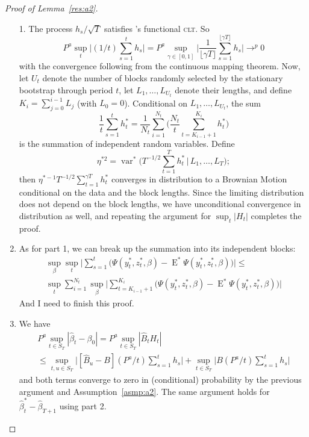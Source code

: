 \documentclass[12pt]{article}
\newcommand\citepos[2][]{\citeauthor{#2}'s \citeyearpar[#1]{#2}}
\theoremstyle{definition}
\DeclareMathOperator{\E}{E}
\DeclareMathOperator{\var}{var}
\newcommand{\clt}{\textsc{clt}}
\begin{document}
\begin{proof}[Proof of Lemma~\ref{res:a2}]
  \begin{enumerate}
  \item[1.] The process $h_{s} / \sqrt{T}$
    satisfies \citepos[Theorem 3.1]{JoD:00b} functional \clt.  So
    \begin{equation}
      P^a \sup_t \Big| (1/t) \sum_{s=1}^t h_{s} \Big| =
      P^a \sup_{\gamma \in [0,1]} \Bigg| \frac{1}{\lfloor \gamma
        T\rfloor} \sum_{s=1}^{\lfloor \gamma T \rfloor} h_{s} \Bigg| \to^{p} 0
    \end{equation}
    with the convergence following from the continuous mapping
    theorem.  Now, let $U_t$ denote the number of blocks randomly
    selected by the stationary bootstrap through period $t$, let $L_1,
    \dots, L_{U_t}$ denote their lengths, and define $K_i =
    \sum_{j=0}^{i-1} L_j$ (with $L_0 = 0$).  Conditional on
    $L_1,\dots,L_{U_t}$, the sum
    \begin{equation}
      \frac{1}{t} \sum_{s=1}^t h_t^{*} = \frac{1}{N_t}
      \sum_{i=1}^{N_t} \Bigg( \frac{N_t}{t} \sum_{t= K_{i-1} + 1}^{K_i}
      h_t^{*} \Bigg)
    \end{equation}
    is the summation of independent random variables.  Define
    \begin{equation}
      \eta^{*2} = \var^{*}\Big(T^{-1/2} \sum_{t=1}^T h_t^{*} \,\Big|\,
      L_1,\dots,L_T \Big);
    \end{equation}
    then $\eta^{*-1} T^{-1/2} \sum_{t=1}^{\gamma T} h_t^{*}$ converges
    in distribution to a Brownian Motion conditional on the data and
    the block lengths.  Since the limiting distribution does not
    depend on the block lengths, we have unconditional convergence in
    distribution as well, and repeating the argument for $\sup_t
    |H_t|$ completes the proof.
  \item As for part 1, we can break up the summation into its
    independent blocks:
    \begin{multline}
      \sup_{\beta} \sup_t \Big| \sum_{s=1}^{t} \big(\Psi(y_t^{*},
      z_t^{*},
      \beta) - \E^{*} \Psi(y_t^{*}, z_t^{*}, \beta)\big) \Big| \leq \\
      \sup_t \sum_{i=1}^{N_t} \sup_{\beta} \Big| \sum_{t =
        K_{i-1}+1}^{K_i} \big(\Psi(y_t^{*}, z_t^{*}, \beta) - \E^{*}
      \Psi(y_t^{*}, z_t^{*}, \beta)\big) \Big|
    \end{multline}
    And I need to finish this proof.
  \item We have
    \begin{multline}
      P^a \sup_{t \in S_T} | \hat{\beta}_t - \beta_0 | = P^a \sup_{t
        \in S_T} |\hat{B}_{t} H_{t}| \\ \leq \sup_{t,u \in S_T} \Big|
      [ \hat{B}_u - B] (P^a/t) \sum_{s=1}^t h_{s} \Big| + \sup_{t\in S_T} \Big|
      B (P^a/t) \sum_{s=1}^t h_{s} \Big|
    \end{multline}
    and both terms converge to zero in (conditional) probability by
    the previous argument and Assumption~\ref{asmp:a2}.  The same
    argument holds for $\hat{\beta}_t^{*} - \hat{\beta}_{T+1}$ using
    part 2.
  \end{enumerate}
\end{proof}
\end{document}
